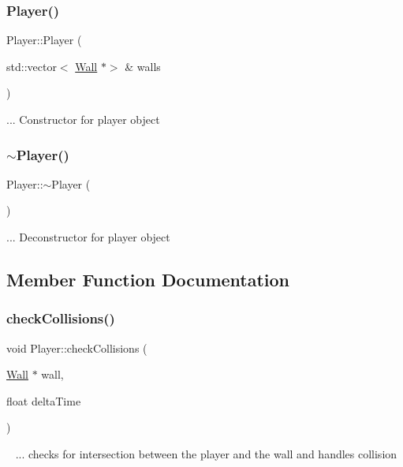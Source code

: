 \subsubsection{\texorpdfstring{Player()}{Player()}}
{\footnotesize\ttfamily Player\+::\+Player (\begin{DoxyParamCaption}\item[{std\+::vector$<$ \mbox{\hyperlink{class_wall}{Wall}} $\ast$$>$ \&}]{walls }\end{DoxyParamCaption})}

... Constructor for player object\mbox{\label{class_player_a749d2c00e1fe0f5c2746f7505a58c062}} 
\subsubsection{\texorpdfstring{$\sim$\+Player()}{~Player()}}
{\footnotesize\ttfamily Player\+::$\sim$\+Player (\begin{DoxyParamCaption}{ }\end{DoxyParamCaption})}

... Deconstructor for player object

\subsection{Member Function Documentation}
\mbox{\label{class_player_ae2d4369f7701288665103149e148a669}} 
\subsubsection{\texorpdfstring{check\+Collisions()}{checkCollisions()}}
{\footnotesize\ttfamily void Player\+::check\+Collisions (\begin{DoxyParamCaption}\item[{\mbox{\hyperlink{class_wall}{Wall}} $\ast$}]{wall,  }\item[{float}]{delta\+Time }\end{DoxyParamCaption})}

~\newline
... checks for intersection between the player and the wall and handles collision\mbox{\label{class_player_a6a0b48c845f9c341283b5fc5a7898f9b}} 
